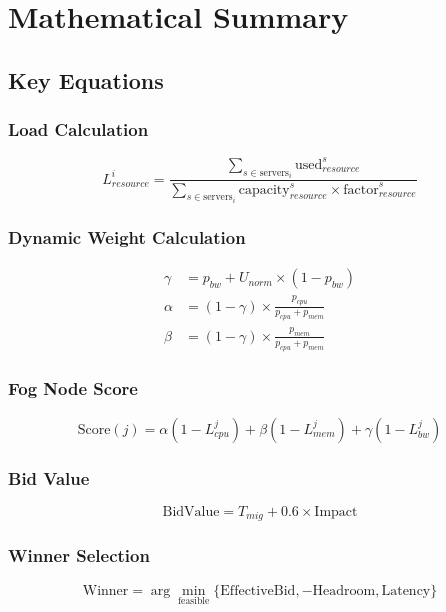 \documentclass[12pt,a4paper]{article}
\begin{document}
\section{Mathematical Summary}

\subsection{Key Equations}

\subsubsection{Load Calculation}
\begin{equation}
    L_{resource}^i = \frac{\sum_{s \in \text{servers}_i} \text{used}_{resource}^s}{\sum_{s \in \text{servers}_i} \text{capacity}_{resource}^s \times \text{factor}_{resource}^s}
\end{equation}

\subsubsection{Dynamic Weight Calculation}
\begin{align}
    \gamma &= p_{bw} + U_{norm} \times (1 - p_{bw}) \\
    \alpha &= (1 - \gamma) \times \frac{p_{cpu}}{p_{cpu} + p_{mem}} \\
    \beta &= (1 - \gamma) \times \frac{p_{mem}}{p_{cpu} + p_{mem}}
\end{align}

\subsubsection{Fog Node Score}
\begin{equation}
    \text{Score}(j) = \alpha (1 - L_{cpu}^j) + \beta (1 - L_{mem}^j) + \gamma (1 - L_{bw}^j)
\end{equation}

\subsubsection{Bid Value}
\begin{equation}
    \text{BidValue} = T_{mig} + 0.6 \times \text{Impact}
\end{equation}

\subsubsection{Winner Selection}
\begin{equation}
    \text{Winner} = \arg\min_{\text{feasible}} \{ \text{EffectiveBid}, -\text{Headroom}, \text{Latency} \}
\end{equation}
\end{document}
